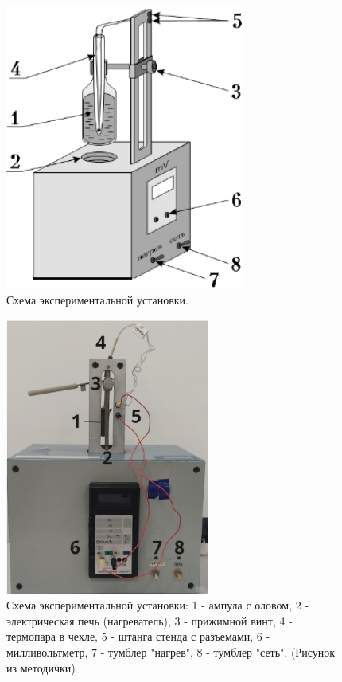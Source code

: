 \documentclass[a4paper]{article}
\begin{document}
\begin{figure}[htbp]
    \centering
    \includegraphics[width=0.7\textwidth]{pick_3} %
    \caption{Схема экспериментальной установки.}
    \label{fig:setup_schema}
\end{figure}\begin{figure}[H]
\begin{center}
\includegraphics[width=0.6\textwidth]{setup_image.png} %
\caption{Схема экспериментальной установки: 1 - ампула с оловом, 2 - электрическая печь (нагреватель), 3 - прижимной винт, 4 - термопара в чехле, 5 - штанга стенда с разъемами, 6 - милливольтметр, 7 - тумблер "нагрев", 8 - тумблер "сеть". (Рисунок из методички)}
\label{fig:setup}
\end{center}
\end{figure}
\end{document}

